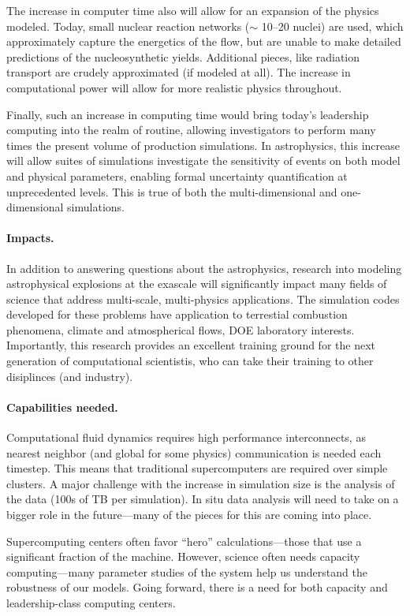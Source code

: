 \documentclass[11pt,twocolumn]{article}
\begin{document}
The increase in computer time also will allow for an expansion of the
physics modeled.  Today, small nuclear reaction networks ($\sim$
10--20 nuclei) are used, which approximately capture the energetics of
the flow, but are unable to make detailed predictions of the
nucleosynthetic yields.  Additional pieces, like radiation transport
are crudely approximated (if modeled at all).  The increase in
computational power will allow for more realistic physics throughout.

Finally, such an increase in computing time would bring today's
leadership computing into the realm of routine, allowing investigators
to perform many times the present volume of production simulations.
In astrophysics, this increase will allow suites of simulations 
investigate the sensitivity of events on both model and physical
parameters, enabling formal uncertainty quantification at 
unprecedented levels.  This is true of both the multi-dimensional
and one-dimensional simulations.

\paragraph*{Impacts.} In addition to answering questions about the 
astrophysics, research into modeling astrophysical explosions at the
exascale will significantly impact many fields of science that address
multi-scale, multi-physics applications.  The simulation codes
developed for these problems have application to terrestial combustion
phenomena, climate and atmospherical flows, DOE laboratory interests.
Importantly, this research provides an excellent training ground for
the next generation of computational scientistis, who can take their
training to other disiplinces (and industry).


\paragraph*{Capabilities needed.}  Computational fluid dynamics requires 
high performance interconnects, as nearest neighbor (and global for
some physics) communication is needed each timestep.  This means that
traditional supercomputers are required over simple clusters.  A major
challenge with the increase in simulation size is the analysis of the
data (100s of TB per simulation).  In situ data analysis will need to
take on a bigger role in the future---many of the pieces for this are
coming into place.

Supercomputing centers often favor ``hero'' calculations---those that
use a significant fraction of the machine.
However, science often needs capacity computing---many parameter
studies of the system help us understand the robustness of our models.
Going forward, there is a need for both capacity and leadership-class
computing centers.
\end{document}
